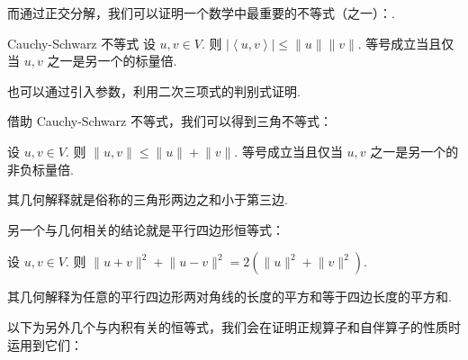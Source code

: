 而通过正交分解，我们可以证明一个数学中最重要的不等式（之一）：.

\begin{theorem}{Cauchy-Schwarz 不等式}{} 
    设 $u, v \in V$. 则 $\left\lvert \left\langle u, v\right\rangle \right\rvert \leqslant \lVert u \rVert\lVert v \rVert$. 等号成立当且仅当 $u, v$ 之一是另一个的标量倍.
\end{theorem}

也可以通过引入参数，利用二次三项式的判别式证明.

借助 Cauchy-Schwarz 不等式，我们可以得到三角不等式：

\begin{theorem}{}{}
    设 $u, v \in V$. 则 $\lVert u, v \rVert \leqslant \lVert u \rVert + \lVert v \rVert$. 等号成立当且仅当 $u, v$ 之一是另一个的非负标量倍.
\end{theorem}

其几何解释就是俗称的三角形两边之和小于第三边.

另一个与几何相关的结论就是平行四边形恒等式：

\begin{theorem}{}{}
    设 $u, v \in V$. 则 $ \lVert u + v \rVert^{2} + \lVert u - v \rVert^{2} = 2(\lVert u \rVert^{2} + \lVert v \rVert^{2})$.
\end{theorem}

其几何解释为任意的平行四边形两对角线的长度的平方和等于四边长度的平方和.

以下为另外几个与内积有关的恒等式，我们会在证明正规算子和自伴算子的性质时运用到它们：

